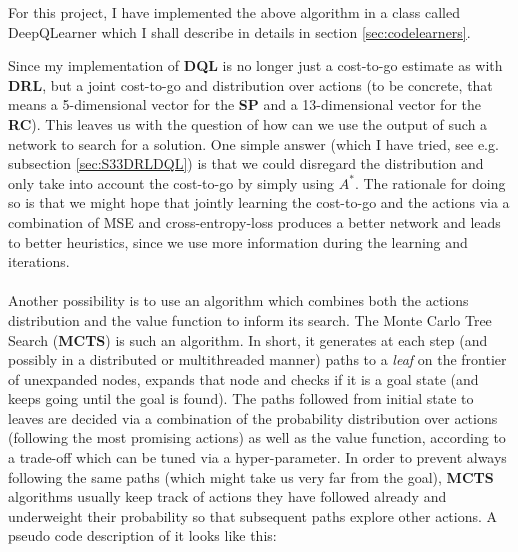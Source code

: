 For this project, I have implemented the above algorithm in a class called DeepQLearner which I shall describe in details in section \ref{sec:codelearners}.


\label{sec:TheoryMCTS}

Since my implementation of \textbf{DQL} is no longer just a cost-to-go estimate as with \textbf{DRL}, but a joint cost-to-go and distribution over actions (to be concrete, that means a 5-dimensional vector for the \textbf{SP} and a 13-dimensional vector for the \textbf{RC}). This leaves us with the question of how can we use the output of such a network to search for a solution. One simple answer (which I have tried, see e.g. subsection \ref{sec:S33DRLDQL}) is that we could disregard the distribution and only take into account the cost-to-go by simply using $A^{*}$. The rationale for doing so is that we might hope that jointly learning the cost-to-go and the actions via a combination of MSE and cross-entropy-loss produces a better network and leads to better heuristics, since we use more information during the learning and iterations.
\\
\\
Another possibility is to use an algorithm which combines both the actions distribution and the value function to inform its search. The Monte Carlo Tree Search (\textbf{MCTS}) is such an algorithm. In short, it generates at each step (and possibly in a distributed or multithreaded manner) paths to a \textit{leaf} on the frontier of unexpanded nodes, expands that node and checks if it is a goal state (and keeps going until the goal is found). The paths followed from initial state to leaves are decided via a combination of the probability distribution over actions (following the most promising actions) as well as the value function, according to a trade-off which can be tuned via a hyper-parameter. In order to prevent always following the same paths (which might take us very far from the goal), \textbf{MCTS} algorithms usually keep track of actions they have followed already and underweight their probability so that subsequent paths explore other actions. A pseudo code description of it looks like this:
\\
\teal
